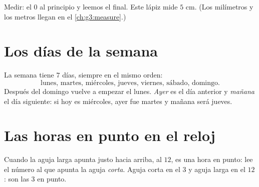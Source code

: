 \begin{omfigure}

{\small Medir: el $0$ al principio y leemos el final. Este lápiz
mide $5$ cm. (Los milímetros y los metros llegan en el
\cref{ch:g3:measure}.)}
\end{omfigure}

\section{Los días de la semana}

\begin{example}\label{ex:g1:measure:days}
La semana tiene $7$ días, siempre en el mismo orden:
\[
\text{lunes, martes, miércoles, jueves, viernes, sábado,
domingo.}
\]
Después del domingo vuelve a empezar el lunes. \emph{Ayer} es el día
anterior y \emph{mañana} el día siguiente: si hoy es miércoles,
ayer fue martes y mañana será jueves.
\end{example}

\section{Las horas en punto en el reloj}

\begin{method}\label{met:g1:measure:clock}
Cuando la aguja larga apunta justo hacia arriba, al $12$, es una hora
en punto: lee el número al que apunta la aguja \emph{corta}. Aguja corta en
el $3$ y aguja larga en el $12$: son las $3$ en punto.
\end{method}


